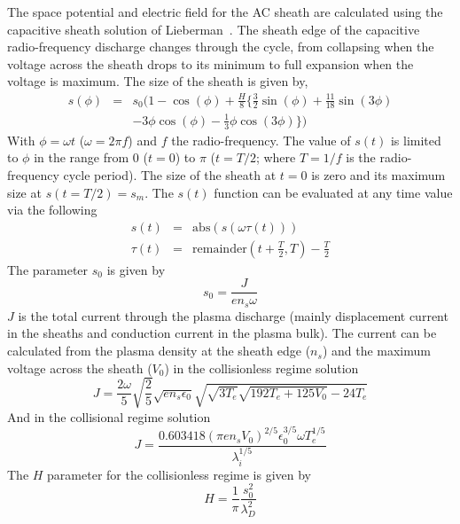 The space potential and electric field for the AC sheath are calculated using the capacitive sheath solution of Lieberman~\cite{Lieberman1988,Lieberman1989}. The sheath edge of the capacitive radio-frequency discharge changes through the cycle, from collapsing when the voltage across the sheath drops to its minimum to full expansion when the voltage is maximum. The size of the sheath is given by, 
\begin{eqnarray}
s(\phi) &=& s_0 ( 1 - \cos(\phi) + \frac{H}{8} \{ \frac32 \sin(\phi)  + \frac{11}{18} \sin(3 \phi) \nonumber \\ 
        & & - 3 \phi \cos(\phi)  - \frac13 \phi \cos(3 \phi)  \} )
\end{eqnarray}
With $\phi = \omega t$ ($\omega = 2 \pi f$) and $f$ the radio-frequency. The value of $s(t)$ is limited to $\phi$ in the range from 0 ($t=0$) to $\pi$ ($t=T/2$; where $T=1/f$ is the radio-frequency cycle period). The size of the sheath at $t=0$ is zero and its maximum size at $s(t=T/2) = s_m$. The $s(t)$ function can be evaluated at any time value via the following 
\begin{eqnarray}
s(t)    &=& \text{abs}(s(\omega \tau(t))) \\
\tau(t) &=& \text{remainder}\left(t+\frac{T}{2},T\right) - \frac{T}{2} 
\end{eqnarray}
The parameter $s_0$ is given by 
\begin{equation}
s_0 = \frac{J}{e n_s \omega}
\end{equation}
$J$ is the total current through the plasma discharge (mainly displacement current in the sheaths and conduction current in the plasma bulk). The current can be calculated from the plasma density at the sheath edge ($n_s$) and the maximum voltage across the sheath ($V_0$) in the collisionless regime solution~\cite{Lieberman1988}
\begin{equation}
J = \frac{2 \omega}{5} \sqrt{\frac25} \sqrt{e n_s \epsilon_0} \sqrt{ \sqrt{3 T_e} \sqrt{192 T_e + 125 V_0} -24 T_e    }
\end{equation}
And in the collisional regime solution~\cite{Lieberman1989}
\begin{equation}
J = \frac{ 0.603418 (\pi e n_s V_0)^{2/5} \epsilon_0^{3/5} \omega T_e^{1/5} }{ \lambda_i^{1/5} }
\end{equation}
The $H$ parameter for the collisionless regime is given by~\cite{Lieberman1988}
\begin{equation}
H = \frac1{\pi} \frac{s_0^2}{\lambda_D^2}
\end{equation}
